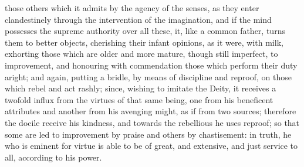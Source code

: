those others which it admits by the agency of the senses, as they enter clandestinely through the
intervention of the imagination, and if the mind possesses the supreme authority over all these, it,
like a common father, turns them to better objects, cherishing their infant opinions, as it were, with
milk, exhorting those which are older and more mature, though still imperfect, to improvement, and
honouring with commendation those which perform their duty aright; and again, putting a bridle, by
means of discipline and reproof, on those which rebel and act rashly; since, wishing to imitate the
Deity, it receives a twofold influx from the virtues of that same being, one from his beneficent
attributes and another from his avenging might, as if from two sources; therefore the docile receive
his kindness, and towards the rebellious he uses reproof; so that some are led to improvement by
praise and others by chastisement: in truth, he who is eminent for virtue is able to be of great, and
extensive, and just service to all, according to his power.

